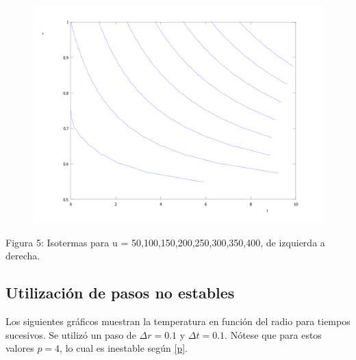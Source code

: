 ﻿\documentclass[%
final,
%
reprint,
%
notitlepage,
narroweqnarray,
inline,
twoside,
invited
]{ieee}
\begin{document}
\begin{figure}[H]
	\begin{center}
	\includegraphics[scale=0.2]{./img/isotemps.png}
	\end{center}
\end{figure}
\begin{center}
\par Figura 5: Isotermas para u = 50,100,150,200,250,300,350,400, de izquierda a derecha.
\end{center}

\subsection{Utilización de pasos no estables}

Los siguientes gráficos muestran la temperatura en función del radio para tiempos sucesivos. Se utilizó un 
paso de $\Delta r = 0.1$ y $\Delta t= 0.1$. Nótese que para estos valores $p=4$, lo cual es inestable según \eqref{p}. 
\end{document}
